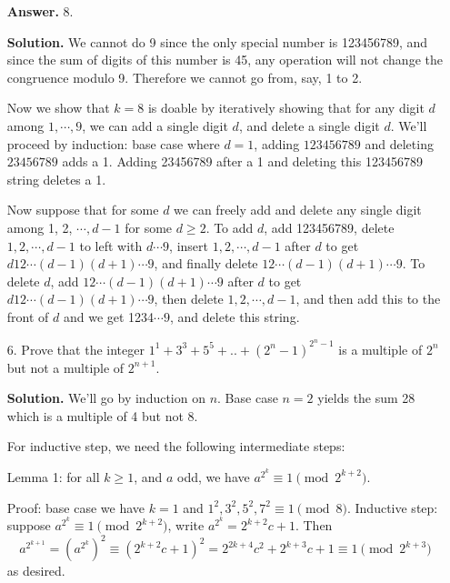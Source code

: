 \documentclass[11pt,a4paper]{article}
\begin{document}
\begin{enumerate}
		\textbf{Answer.} 8. 
		
		\textbf{Solution.} 
		We cannot do 9 since the only special number is 123456789, 
		and since the sum of digits of this number is 45, any operation will not change the congruence modulo 9. 
		Therefore we cannot go from, say, 1 to 2. 
		
		Now we show that $k=8$ is doable by iteratively showing that for any digit $d$ among $1, \cdots, 9$, 
		we can add a single digit $d$, and delete a single digit $d$. 
		We'll proceed by induction: 
		base case where $d=1$, adding $123456789$ and deleting $23456789$ adds a 1. 
	    Adding 23456789 after a 1 and deleting this 123456789 string deletes a 1. 
	    
	    Now suppose that for some $d$ we can freely add and delete any single digit among 1, 2, $\cdots, d-1$ for some $d\ge 2$. 
	    To add $d$, add 123456789, delete $1, 2, \cdots, d-1$ to left with $d\cdots9$, 
	    insert $1, 2, \cdots, d-1$ after $d$ to get $d12\cdots(d-1)(d+1)\cdots 9$, 
	    and finally delete $12\cdots(d-1)(d+1)\cdots 9$. 
	    To delete $d$, add $12\cdots(d-1)(d+1)\cdots 9$ after $d$ to get $d12\cdots(d-1)(d+1)\cdots 9$, 
	    then delete $1, 2, \cdots, d-1$, and then add this to the front of $d$
	    and we get 1234$\cdots 9$, and delete this string. 
		
		\item[6.] Prove that the integer $1^1 + 3^3 + 5^5 + .. + (2^n - 1)^{2^n-1}$ is a multiple of $2^n$ but not a multiple of $2^{n+1}$.
		
		\textbf{Solution.} We'll go by induction on $n$. Base case $n=2$ yields the sum 28 which is a multiple of 4 but not 8. 
		
		For inductive step, we need the following intermediate steps: 
		
		Lemma 1: for all $k\ge 1$, and $a$ odd, we have $a^{2^k}\equiv 1\pmod{2^{k+2}}$. 
		
		Proof: base case we have $k=1$ and $1^2, 3^2, 5^2, 7^2\equiv 1\pmod{8}$. Inductive step: suppose $a^{2^k}\equiv 1\pmod{2^{k+2}}$, write $a^{2^k}=2^{k+2}c+1$. Then 
		\[
		a^{2^{k+1}}=(a^{2^k})^2\equiv (2^{k+2}c+1)^2 = 2^{2k+4}c^2+2^{k+3}c+1\equiv 1\pmod{2^{k+3}}
		\]
		as desired. 
		

\end{enumerate}
\end{document}
